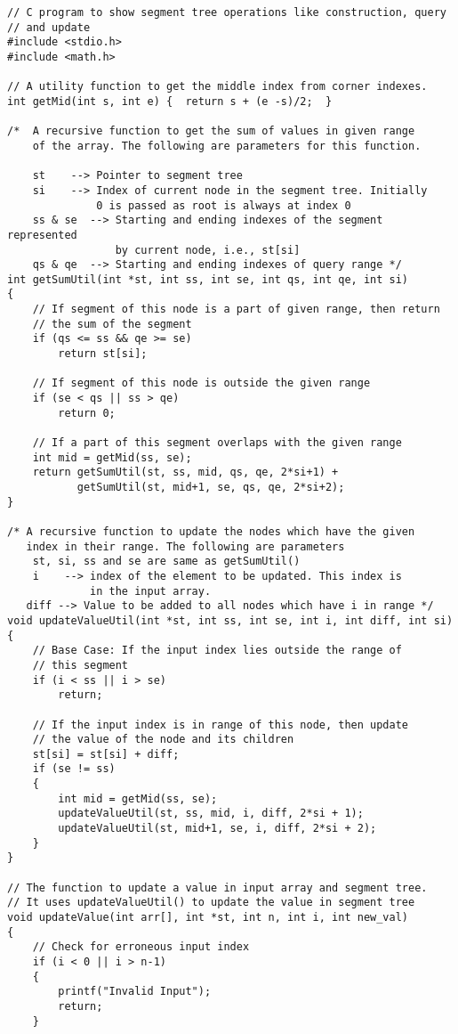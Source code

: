 \begin{verbatim}
// C program to show segment tree operations like construction, query 
// and update 
#include <stdio.h> 
#include <math.h> 
  
// A utility function to get the middle index from corner indexes. 
int getMid(int s, int e) {  return s + (e -s)/2;  } 
  
/*  A recursive function to get the sum of values in given range 
    of the array. The following are parameters for this function. 
  
    st    --> Pointer to segment tree 
    si    --> Index of current node in the segment tree. Initially 
              0 is passed as root is always at index 0 
    ss & se  --> Starting and ending indexes of the segment represented 
                 by current node, i.e., st[si] 
    qs & qe  --> Starting and ending indexes of query range */
int getSumUtil(int *st, int ss, int se, int qs, int qe, int si) 
{ 
    // If segment of this node is a part of given range, then return 
    // the sum of the segment 
    if (qs <= ss && qe >= se) 
        return st[si]; 
  
    // If segment of this node is outside the given range 
    if (se < qs || ss > qe) 
        return 0; 
  
    // If a part of this segment overlaps with the given range 
    int mid = getMid(ss, se); 
    return getSumUtil(st, ss, mid, qs, qe, 2*si+1) + 
           getSumUtil(st, mid+1, se, qs, qe, 2*si+2); 
} 
  
/* A recursive function to update the nodes which have the given  
   index in their range. The following are parameters 
    st, si, ss and se are same as getSumUtil() 
    i    --> index of the element to be updated. This index is  
             in the input array. 
   diff --> Value to be added to all nodes which have i in range */
void updateValueUtil(int *st, int ss, int se, int i, int diff, int si) 
{ 
    // Base Case: If the input index lies outside the range of  
    // this segment 
    if (i < ss || i > se) 
        return; 
  
    // If the input index is in range of this node, then update  
    // the value of the node and its children 
    st[si] = st[si] + diff; 
    if (se != ss) 
    { 
        int mid = getMid(ss, se); 
        updateValueUtil(st, ss, mid, i, diff, 2*si + 1); 
        updateValueUtil(st, mid+1, se, i, diff, 2*si + 2); 
    } 
} 
  
// The function to update a value in input array and segment tree. 
// It uses updateValueUtil() to update the value in segment tree 
void updateValue(int arr[], int *st, int n, int i, int new_val) 
{ 
    // Check for erroneous input index 
    if (i < 0 || i > n-1) 
    { 
        printf("Invalid Input"); 
        return; 
    } 
  

\end{verbatim}
